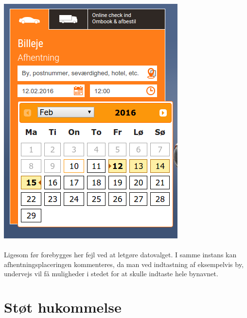 \documentclass[12pt]{article}
\begin{document}
\includegraphics[scale=0.5]{img/calendar}
\\
\\
Ligesom før forebygges her fejl ved at letgøre datovalget. I samme instans kan afhentningsplaceringen kommenteres, da man ved indtastning af eksempelvis by, undervejs vil få muligheder i stedet for at skulle indtaste hele bynavnet.

\section{Støt hukommelse}
\end{document}
